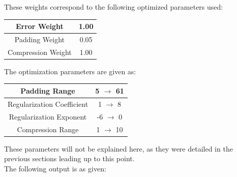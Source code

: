 \documentclass[11pt, a4paper]{article}
\theoremstyle{definition}
\numberwithin{equation}{section}
\begin{document}
These weights correspond to the following optimized parameters used:

\begin{center}
\begin{tabular}{ | c | c | } 
  \hline
   Error Weight & 1.00 \\ 
  \hline
  Padding Weight & 0.05 \\ 
  \hline
  Compression Weight & 1.00 \\ 
  \hline
\end{tabular}
\end{center}

The optimization parameters are given as:

\begin{center}
\begin{tabular}{ | c | c | } 
  \hline
   Padding Range & 5 $\rightarrow$ 61 \\ 
  \hline
  Regularization Coefficient & 1 $\rightarrow$ 8 \\ 
  \hline
  Regularization Exponent & -6 $\rightarrow$ 0 \\ 
  \hline
  Compression Range & 1 $\rightarrow$ 10 \\ 
  \hline
\end{tabular}
\end{center}

These parameters will not be explained here, as they were detailed in the previous sections leading up to this point.
\\
The following output is as given:
\end{document}
